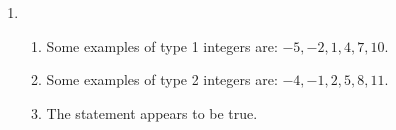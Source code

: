 \begin{enumerate} 
\item \begin{enumerate} 
\item  Some examples of type 1 integers are: $-5, -2, 1, 4, 7, 10$.
\item  Some examples of type 2 integers are: $-4, -1, 2, 5, 8, 11$.
\item  The statement appears to be true.
\end{enumerate}
\end{enumerate}

%

